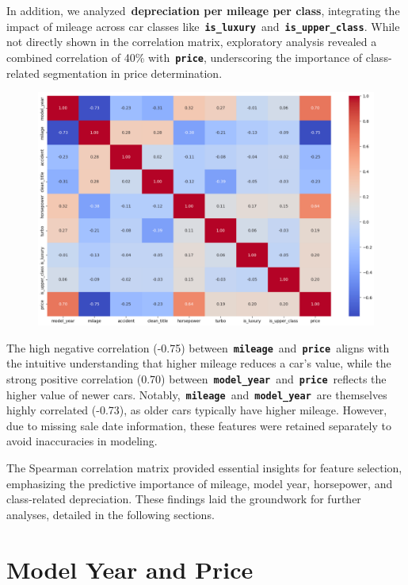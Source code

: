 \documentclass[a4paper,oneside,bibliography=totoc]{scrbook}
\begin{document}
In addition, we analyzed~\textbf{depreciation per mileage per class}, integrating the impact of mileage across car classes like~\textbf{\texttt{is\_luxury}}~and~\textbf{\texttt{is\_upper\_class}}. While not directly shown in the correlation matrix, exploratory analysis revealed a combined correlation of 40\% with~\textbf{\texttt{price}}, underscoring the importance of class-related segmentation in price determination.

\begin{figure}
	\includegraphics[width=\linewidth]{images/spearman_correlation.png}
	\centering
\end{figure}

The high negative correlation (-0.75) between~\textbf{\texttt{mileage}}~and~\textbf{\texttt{price}}~aligns with the intuitive understanding that higher mileage reduces a car's value, while the strong positive correlation (0.70) between~\textbf{\texttt{model\_year}}~and~\textbf{\texttt{price}}~reflects the higher value of newer cars. Notably,~\textbf{\texttt{mileage}}~and~\textbf{\texttt{model\_year}}~are themselves highly correlated (-0.73), as older cars typically have higher mileage. However, due to missing sale date information, these features were retained separately to avoid inaccuracies in modeling.

The Spearman correlation matrix provided essential insights for feature selection, emphasizing the predictive importance of mileage, model year, horsepower, and class-related depreciation. These findings laid the groundwork for further analyses, detailed in the following sections.

\section{Model Year and Price}
\label{sec:modelYearAndPrice}
\end{document}
